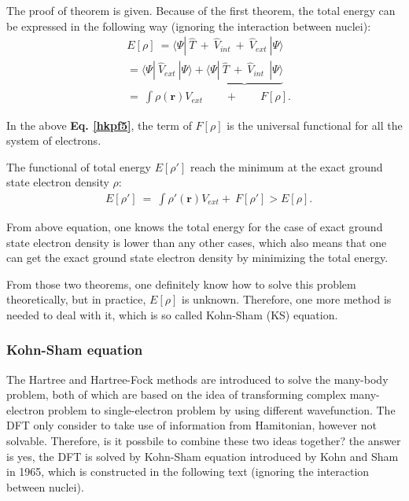 \documentclass[a4paper, 12pt, titlepage,oneside,drop]{kthesis}
\begin{document}
The proof of theorem is given. Because of the first theorem, the total energy can be expressed in the following way (ignoring the interaction between nuclei):
\begin{equation}\label{hkpf5}\begin{split}
& E[\rho] \ = \langle \Psi  | \ \hat{T} \ + \ \hat{V}_\textit{int}  \ + \ \hat{V}_\textit{ext} \ | \Psi \rangle \\
&     = \langle \Psi  | \ \hat{V}_\textit{ext} \ | \Psi \rangle  + \underbrace{\langle \Psi  | \ \hat{T} \ + \ \hat{V}_\textit{int}  \ \ | \Psi \rangle}  \\
&     =   \ \int \rho(\textbf{r}) V_\textit{ext} \qquad +  \qquad F[\rho]. 
\end{split}
\end{equation}

In the above \textbf{Eq. \ref{hkpf5}}, the term of $F[\rho]$ is the universal functional for all the system of electrons.

The functional of total energy $E[\rho']$ reach the minimum at the exact ground state electron density $\rho$:
\begin{equation}\begin{split}
 & E[\rho'] \ =   \ \int \rho'(\textbf{r}) V_\textit{ext}  + \  F[\rho'] > E[\rho]. 
\end{split}
\end{equation}
 


From above equation, one knows the total energy for the case of exact ground state electron density is lower than any other cases, which also means that one can get 
the exact ground state electron density by minimizing the total energy.



From those two theorems, one definitely know how to solve this problem theoretically, but in practice, $E[\rho]$ is unknown. 
Therefore, one more method is needed to deal with it, which is so called Kohn-Sham (KS) equation.

\subsubsection{Kohn-Sham equation}

The Hartree and Hartree-Fock methods are introduced to solve the many-body problem, both of which are based on the idea of transforming complex 
many-electron problem to single-electron problem by using different wavefunction. The DFT only consider to take use of information from Hamitonian, however not solvable. 
Therefore, is it possbile to combine these two ideas together? the answer is yes, the DFT is solved by Kohn-Sham equation introduced by Kohn and Sham in 1965,
which is constructed in the following text (ignoring the interaction between nuclei).
\end{document}

